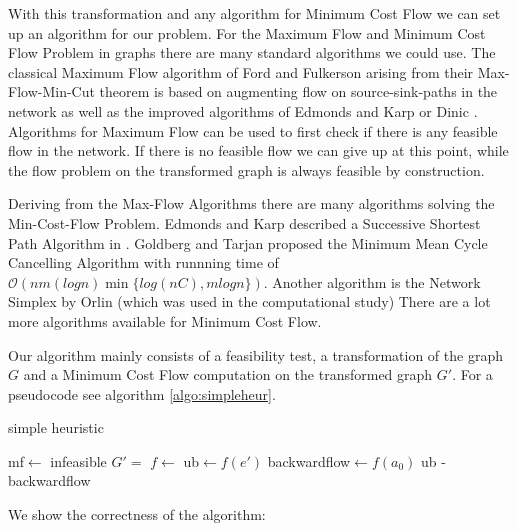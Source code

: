 With this transformation and any algorithm for Minimum Cost Flow we can set up an algorithm for our problem. 
For the Maximum Flow and Minimum Cost Flow Problem in graphs there are many standard algorithms we could use. The 
classical Maximum Flow algorithm of Ford and Fulkerson \cite{Ford-Fulkerson_algo} arising from their Max-Flow-Min-Cut 
theorem is based on augmenting flow on source-sink-paths in the network as well as the improved algorithms of Edmonds 
and Karp \cite{EdmondsKarp1972} or Dinic \cite{Dinic1970}. Algorithms for Maximum Flow can be used to first check if 
there is any feasible flow in the network. If there is no feasible flow we can give up at this point, while the flow 
problem on the transformed graph is always feasible by construction.

Deriving from the Max-Flow Algorithms there are many algorithms solving the Min-Cost-Flow Problem. Edmonds and 
Karp described a Successive Shortest Path Algorithm in \cite{EdmondsKarp1972}. Goldberg and Tarjan proposed the Minimum 
Mean Cycle Cancelling Algorithm \cite{minMeanCycleCancelling89} with runnning time of $\mathcal{O}(nm(log 
n)\min\{log(nC), m log n\}) $. %
Another algorithm is the Network Simplex by Orlin \cite{NetworkSimplexOrlin97} (which was used in the computational 
study) There are a lot more algorithms available for Minimum Cost Flow.

Our algorithm mainly consists of a feasibility test, a transformation of the graph $G$ and a Minimum Cost Flow 
computation on the transformed graph $G'$. For a pseudocode see algorithm \ref{algo:simpleheur}. 

\begin{algorithm}
 \caption{simple heuristic}
 \label{algo:simpleheur}
 \begin{algorithmic}
  \State mf$\gets$ 
    \State\Return infeasible
  \EndIf
  \State $G'=$ 
  \State $f\gets$ 
  \State ub$\gets f(e')$
  \State backwardflow$\gets f(a_0)$
  \State \Return ub - backwardflow
  \EndFunction
 \end{algorithmic}
\end{algorithm}

We show the correctness of the algorithm: %

